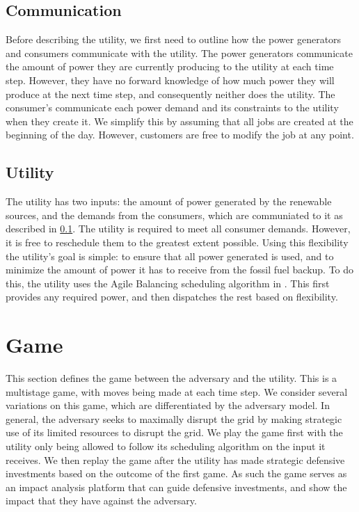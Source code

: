\documentclass[conference]{IEEEtran}
\begin{document}
\subsection{Communication}
\label{Communication}

Before describing the utility, we first need to outline how the power generators and consumers communicate with the utility.  The power generators communicate the amount of power they are currently producing to the utility at each time step.  However, they have no forward knowledge of how much power they will produce at the next time step, and consequently neither does the utility.  The consumer's communicate each power demand and its constraints to the utility when they create it.  We simplify this by assuming that all jobs are created at the beginning of the day.  However, customers are free to modify the job at any point.

\subsection{Utility}
\label{Utility}

The utility has two inputs: the amount of power generated by the renewable sources, and the demands from the consumers, which are communiated to it as described in \ref{Communication}.  The utility is required to meet all consumer demands.  However, it is free to reschedule them to the greatest extent possible.  Using this flexibility the utility's goal is simple: to ensure that all power generated is used, and to minimize the amount of power it has to receive from the fossil fuel backup. To do this, the utility uses the Agile Balancing scheduling algorithm in \cite{petersen2013taxonomy}.  This first provides any required power, and then dispatches the rest based on flexibility.

\section{Game}
\label{Game}

This section defines the game between the adversary and the utility.  This is a multistage game, with moves being made at each time step.  We consider several variations on this game, which are differentiated by the adversary model.  In general, the adversary seeks to maximally disrupt the grid by making strategic use of its limited resources to disrupt the grid.  We play the game first with the utility only being allowed to follow its scheduling algorithm on the input it receives.  We then replay the game after the utility has made strategic defensive investments based on the outcome of the first game.  As such the game serves as an impact analysis platform that can guide defensive investments, and show the impact that they have against the adversary.   
\end{document}

